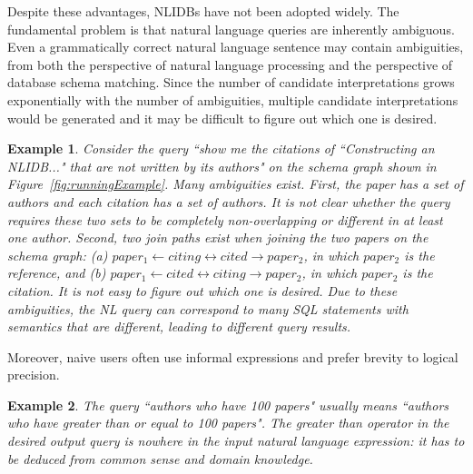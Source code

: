 \documentclass{vldb}
\newtheorem{example}{Example}
\begin{document}
Despite these advantages, NLIDBs have not been adopted widely.  The fundamental problem is that natural language queries are inherently ambiguous.  Even a grammatically correct natural language sentence may contain ambiguities, from both the perspective of natural language processing and the perspective of database schema matching.  Since the number of candidate interpretations grows exponentially with the number of ambiguities, multiple candidate interpretations would be generated and it may be difficult to figure out which one is desired.  
\begin{example}
\label{example:example1}
Consider the query ``show me the citations of ``Constructing an NLIDB..." that are not written by its authors" on the schema graph shown in Figure~\ref{fig:runningExample}.  Many ambiguities exist.  First, the paper has a set of authors and each citation has a set of authors.  It is not clear whether the query requires these two sets to be completely non-overlapping or different in at least one author.  Second, two join paths exist when joining the two papers on the schema graph: (a) $paper_1 \leftarrow citing \leftrightarrow cited \rightarrow paper_2$, in which $paper_2$ is the reference, and (b) $paper_1 \leftarrow cited \leftrightarrow citing \rightarrow paper_2$, in which $paper_2$ is the citation.  It is not easy to figure out which one is desired.  Due to these ambiguities, the NL query can correspond to many SQL statements with semantics that are different, leading to different query results.  
\end{example}

Moreover, naive users often use informal expressions and prefer brevity to logical precision.  
\begin{example}
\label{example:example2}
The query ``authors who have 100 papers" usually means ``authors who have greater than or equal to 100 papers".  The greater than operator in the desired output query is nowhere in the input natural language expression: it has to be deduced from common sense and domain knowledge.
\end{example}
\end{document}
